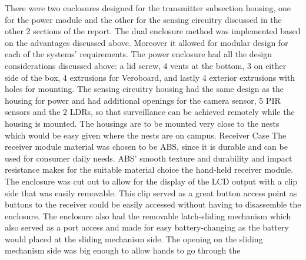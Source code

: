 There were two enclosures designed for the transmitter subsection housing, one for the power module and the other for the sensing circuitry discussed in the other 2 sections of the report. The dual enclosure method was implemented based on the advantages discussed above. Moreover it allowed for modular design for each of the systems’ requirements. 
The power enclosure had all the design considerations discussed above: a lid screw, 4 vents at the bottom, 3 on either side of the box, 4 extrusions for Veroboard, and lastly 4 exterior extrusions with holes for mounting.
The sensing circuitry housing had the same design as the housing for power and had additional openings for the camera sensor, 5 PIR sensors and the 2 LDRs, so that surveillance can be achieved remotely while the housing is mounted. The housings are to be mounted very close to the nests which would be easy given where the nests are on campus. 
Receiver Case
The receiver module material was chosen to be ABS, since it is durable and can be used for consumer daily needs. ABS’ smooth texture and durability and impact resistance makes for the suitable material choice the hand-held receiver module. 
The enclosure was cut out to allow for the display of the LCD output with a clip side that was easily removable. This clip served as a great button access point as buttons to the receiver could be easily accessed without having to disassemble the enclosure. 
The enclosure also had the removable latch-sliding mechanism which also served as a port access and made for easy battery-changing as the battery would placed at the sliding mechanism side. The opening on the sliding mechanism side was big enough to allow hands to go through the  

